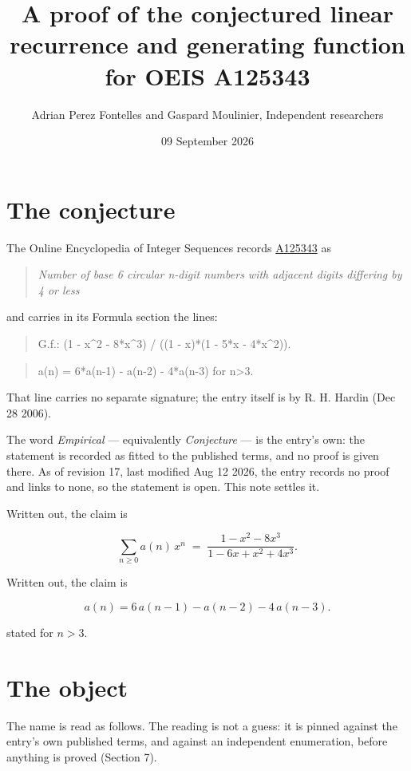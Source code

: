 \documentclass[11pt]{article}
\title{A proof of the conjectured linear recurrence and generating function for OEIS A125343}
\author{Adrian Perez Fontelles and Gaspard Moulinier, Independent researchers}
\date{09 September 2026}
\theoremstyle{definition}
\begin{document}
\maketitle
\section{The conjecture}

The Online Encyclopedia of Integer Sequences records \href{https://oeis.org/A125343}{A125343} as

\begin{quote}\itshape Number of base 6 circular n-digit numbers with adjacent digits differing by 4 or less\end{quote}

and carries in its Formula section the lines:

\begin{quote}\ttfamily G.f.: (1 - x\textasciicircum{}2 - 8*x\textasciicircum{}3) / ((1 - x)*(1 - 5*x - 4*x\textasciicircum{}2)).\end{quote}

\begin{quote}\ttfamily a(n) = 6*a(n-1) - a(n-2) - 4*a(n-3) for n>3.\end{quote}

That line carries no separate signature; the entry itself is by R. H. Hardin (Dec 28 2006).

The word {\itshape Empirical} --- equivalently {\itshape Conjecture} --- is the entry's own: the statement is recorded as fitted to the published terms, and no proof is given there. As of revision 17, last modified Aug 12 2026, the entry records no proof and links to none, so the statement is open. This note settles it.

Written out, the claim is

\[\sum_{n \ge 0} a(n)\,x^n \;=\; \frac{1 - x^{2} - 8x^{3}}{1 - 6x + x^{2} + 4x^{3}}.\]

Written out, the claim is

\[a(n) = 6\,a(n-1) - a(n-2) - 4\,a(n-3).\]

stated for $n > 3$.

\section{The object}

The name is read as follows. The reading is not a guess: it is pinned against the entry's own published terms, and against an independent enumeration, before anything is proved (Section 7).
\end{document}
